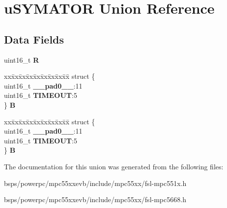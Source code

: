 \hypertarget{unionuSYMATOR}{}\section{u\+S\+Y\+M\+A\+T\+OR Union Reference}
\label{unionuSYMATOR}
\subsection*{Data Fields}
\begin{DoxyCompactItemize}
\item 
\mbox{\label{unionuSYMATOR_ab10f948ab8c533d5ceec1eb31224aa42}} 
uint16\+\_\+t {\bfseries R}
\item 
\mbox{\label{unionuSYMATOR_a0b4b56c41f264ba29d1538e408652061}} 
\begin{tabbing}
xx\=xx\=xx\=xx\=xx\=xx\=xx\=xx\=xx\=\kill
struct \{\\
\>uint16\_t {\bfseries \_\_pad0\_\_}:11\\
\>uint16\_t {\bfseries TIMEOUT}:5\\
\} {\bfseries B}\\

\end{tabbing}\item 
\mbox{\label{unionuSYMATOR_a03eea5e69fcba856d75ff8fb5b07b27a}} 
\begin{tabbing}
xx\=xx\=xx\=xx\=xx\=xx\=xx\=xx\=xx\=\kill
struct \{\\
\>uint16\_t {\bfseries \_\_pad0\_\_}:11\\
\>uint16\_t {\bfseries TIMEOUT}:5\\
\} {\bfseries B}\\

\end{tabbing}\end{DoxyCompactItemize}


The documentation for this union was generated from the following files\+:\begin{DoxyCompactItemize}
\item 
bsps/powerpc/mpc55xxevb/include/mpc55xx/fsl-\/mpc551x.\+h\item 
bsps/powerpc/mpc55xxevb/include/mpc55xx/fsl-\/mpc5668.\+h\end{DoxyCompactItemize}
